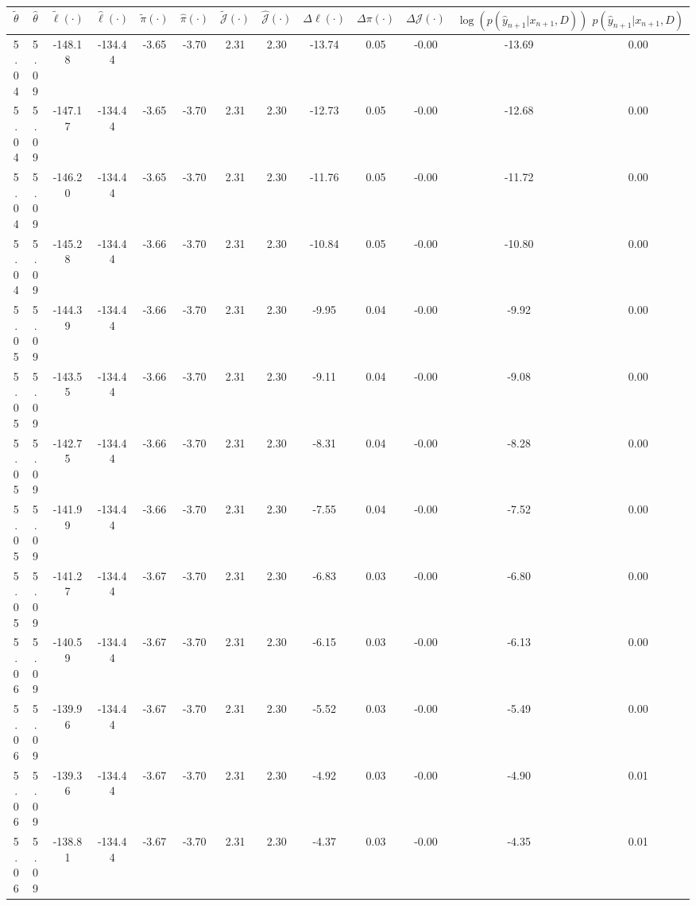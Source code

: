 \begin{table}[htbp]
        \centering
        \tiny
        \begin{adjustbox}{angle=90}
            \begin{tabular}{|c|c|c|c|c|c|c|c|c|c|c|c|c|}
                \hline
                 $\tilde{\theta}$ & $\hat{\theta}$ & $\tilde{\ell}(\cdot)$ & $\hat{\ell}(\cdot)$ & $\tilde{\pi}(\cdot)$ & $\hat{\pi}(\cdot)$ & $\tilde{\mathcal{J}}(\cdot)$ & $\hat{\mathcal{J}}(\cdot)$ & $\Delta \ell(\cdot)$ & $\Delta \pi(\cdot)$ & $\Delta \mathcal{J}(\cdot)$ & $\log(p(\hat{y}_{n+1}|x_{n+1}, D))$ & $p(\hat{y}_{n+1}|x_{n+1}, D)$ \\
                \hline
                 5.04 & 5.09 & -148.18 & -134.44 & -3.65 & -3.70 & 2.31 & 2.30 & -13.74 & 0.05 & -0.00 & -13.69 & 0.00\\ \hline
 5.04 & 5.09 & -147.17 & -134.44 & -3.65 & -3.70 & 2.31 & 2.30 & -12.73 & 0.05 & -0.00 & -12.68 & 0.00\\ \hline
 5.04 & 5.09 & -146.20 & -134.44 & -3.65 & -3.70 & 2.31 & 2.30 & -11.76 & 0.05 & -0.00 & -11.72 & 0.00\\ \hline
 5.04 & 5.09 & -145.28 & -134.44 & -3.66 & -3.70 & 2.31 & 2.30 & -10.84 & 0.05 & -0.00 & -10.80 & 0.00\\ \hline
 5.05 & 5.09 & -144.39 & -134.44 & -3.66 & -3.70 & 2.31 & 2.30 & -9.95 & 0.04 & -0.00 & -9.92 & 0.00\\ \hline
 5.05 & 5.09 & -143.55 & -134.44 & -3.66 & -3.70 & 2.31 & 2.30 & -9.11 & 0.04 & -0.00 & -9.08 & 0.00\\ \hline
 5.05 & 5.09 & -142.75 & -134.44 & -3.66 & -3.70 & 2.31 & 2.30 & -8.31 & 0.04 & -0.00 & -8.28 & 0.00\\ \hline
 5.05 & 5.09 & -141.99 & -134.44 & -3.66 & -3.70 & 2.31 & 2.30 & -7.55 & 0.04 & -0.00 & -7.52 & 0.00\\ \hline
 5.05 & 5.09 & -141.27 & -134.44 & -3.67 & -3.70 & 2.31 & 2.30 & -6.83 & 0.03 & -0.00 & -6.80 & 0.00\\ \hline
 5.06 & 5.09 & -140.59 & -134.44 & -3.67 & -3.70 & 2.31 & 2.30 & -6.15 & 0.03 & -0.00 & -6.13 & 0.00\\ \hline
 5.06 & 5.09 & -139.96 & -134.44 & -3.67 & -3.70 & 2.31 & 2.30 & -5.52 & 0.03 & -0.00 & -5.49 & 0.00\\ \hline
 5.06 & 5.09 & -139.36 & -134.44 & -3.67 & -3.70 & 2.31 & 2.30 & -4.92 & 0.03 & -0.00 & -4.90 & 0.01\\ \hline
 5.06 & 5.09 & -138.81 & -134.44 & -3.67 & -3.70 & 2.31 & 2.30 & -4.37 & 0.03 & -0.00 & -4.35 & 0.01\\ \hline

\end{tabular}
\end{adjustbox}
\end{table}
